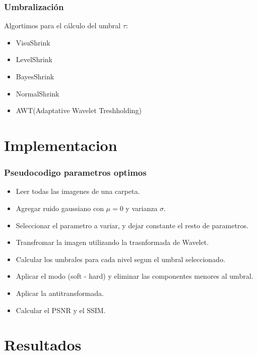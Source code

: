 \documentclass{beamer}
\begin{document}
\begin{frame}
  \frametitle{Umbralización}
Algortimos para el cálculo del umbral $\tau$:
\begin{itemize}
  \item VisuShrink
  \item LevelShrink
  \item BayesShrink
  \item NormalShrink
  \item AWT(Adaptative Wavelet Treshholding)
\end{itemize}
\end{frame}






  \section{Implementacion}

  \begin{frame}
    \frametitle{Pseudocodigo parametros optimos}
  
    \begin{itemize}
      \item Leer todas las imagenes de una carpeta.
      \item Agregar ruido gaussiano con $\mu=0$ y varianza $\sigma$.
      \item Seleccionar el parametro a variar, y dejar constante el resto de parametros.
      \item Transfromar la imagen utilizando la trasnformada de Wavelet.
      \item Calcular los umbrales para cada nivel segun el umbral seleccionado.
      \item Aplicar el modo (soft - hard) y eliminar las componentes menores al umbral.
      \item Aplicar la antitransformada.
      \item Calcular el PSNR y el SSIM.
    \end{itemize}
  
  \end{frame}


  






  \section{Resultados}
\end{document}

